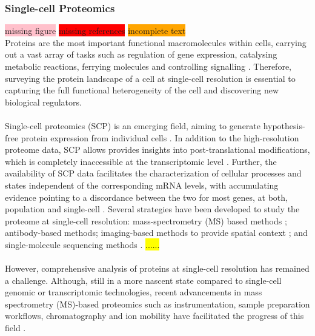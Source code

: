 \subsubsection{Single-cell Proteomics}
\colorbox{pink}{missing figure} \colorbox{red}{missing references} \colorbox{orange}{incomplete text}\\
Proteins are the most important functional macromolecules within cells, carrying out a vast array of tasks such as regulation of gene expression, catalysing metabolic reactions, ferrying molecules and controlling signalling \textbf{\cite{labib_single-cell_2020,proteomics}}. Therefore, surveying the protein landscape of a cell at single-cell resolution is essential to capturing the full functional heterogeneity of the cell and discovering new biological regulators.\\\\
Single-cell proteomics (SCP) is an emerging field, aiming to generate hypothesis-free protein expression from individual cells \textbf{\cite{ctortecka_rise_2021,}}. In addition to the high-resolution proteome data, SCP allows provides insights into post-translational modifications, which is completely inaccessible at the transcriptomic level \textbf{\cite{labib_single-cell_2020,ctortecka_rise_2021,petrosius_recent_2022}}. Further, the availability of SCP data facilitates the characterization of cellular processes and states independent of the corresponding mRNA levels, with accumulating evidence pointing to a discordance between the two for most genes, at both, population and single-cell \textbf{\cite{ctortecka_rise_2021,petrosius_recent_2022,bennett_single-cell_2023}}. Several strategies have been developed to study the proteome at single-cell resolution: mass-spectrometry (MS) based methods \textbf{\cite{petrosius_recent_2022,budnik_scope-ms_2018,zhu_nanodroplet_2018}}; antibody-based methods; imaging-based methods to provide spatial context \textbf{\cite{paul_imaging_2021,chang_imaging_2017,keren_mibi-tof_2019}}; and single-molecule sequencing methods \textbf{\cite{alfaro_emerging_2021}}.    \hl{......}\\\\
However, comprehensive analysis of proteins at single-cell resolution has remained a challenge. Although, still in a more nascent state compared to single-cell genomic or transcriptomic technologies, recent advancements in mass spectrometry (MS)-based proteomics such as instrumentation, sample preparation workflows, chromatography and ion mobility have facilitated the progress of this field \textbf{\cite{ctortecka_rise_2021,petrosius_recent_2022}}.\\\\
